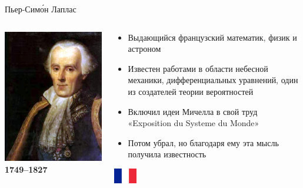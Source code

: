 \documentclass[usenames,dvipsnames,pdftex,unicode,hidelinks]{beamer}
\begin{document}
  \begin{frame}{Пьер-Сим\'{о}н Лаплас}
    \begin{columns}[t]
      \begin{column}{0.25\textwidth}
        \begin{center}
          \includegraphics[width=\textwidth]{laplace}\\
          \textbf{1749--1827}
        \end{center}
      \end{column}
      \begin{column}{0.75\textwidth}
        \begin{itemize}
          \item Выдающийся французский математик, физик и астроном
          \item Известен работами в области небесной механики, дифференциальных уравнений, один из создателей теории вероятностей
          \item \alert{Включил идеи Мичелла} в свой труд «Exposition du Systeme du Monde»
          \item Потом убрал, но благодаря ему эта мысль \alert{получила известность}
        \end{itemize}
        \begin{center}
          \includegraphics[width=1cm]{france}
        \end{center}
      \end{column}
    \end{columns}
  \end{frame}
\end{document}
